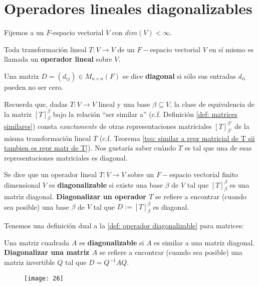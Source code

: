 \section{Operadores lineales diagonalizables}
Fijemos a un $F$-espacio vectorial $V$ con $dim(V) < \infty$.
\begin{defi}
Toda transformación lineal $T: V \longrightarrow V$
de un $F-$espacio vectorial $V$ en sí mismo es llamada un
\textbf{operador lineal} sobre $V$.
\end{defi}
 

\begin{defi}
Una matriz $D = (d_{ij})
\in M_{n \times n}(F)$ se dice \textbf{diagonal} si sólo
sus entradas $d_{ii}$ pueden no ser cero.
\end{defi}

Recuerda que, dadas $T: V \longrightarrow V$ lineal y una base
$\beta \subseteq V$, la clase de equivalencia de la matriz
$[T]_{\beta}^{\beta}$ 
bajo la relación ``ser similar a''
(c.f. Definición \ref{def: matrices similares})
consta \textit{exactamente} de otras representaciones
matriciales $[T]_{\beta'}^{\beta'}$ de la misma transformación 
lineal $T$ 
(c.f. Teorema 
\ref{teo: similar a repr matricial de T sii tambien es repr matr de T}).
Nos gustaría saber cuándo $T$ es tal que una de esas representaciones
matriciales es diagonal.

\begin{defi}
	\label{def: operador diagonalizable}
Se dice que un operador lineal $T: V \longrightarrow V$ sobre
un $F-$espacio vectorial finito dimensional $V$ es
\textbf{diagonalizable} si existe una base $\beta$ de $V$
tal que $[T]_{\beta}^{\beta}$ es una matriz diagonal.
\textbf{Diagonalizar un operador $T$} se refiere a encontrar
(cuando sea posible) una base $\beta$ de $V$ tal que
$D:= [T]_{\beta}^{\beta}$ es diagonal.
\end{defi}
Tenemos una definición dual a la \ref{def: operador diagonalizable}
para matrices:
\begin{defi}
	\label{def: matriz diagonalizable}
Una matriz cuadrada $A$ es \textbf{diagonalizable} si $A$
es similar a una matriz diagonal. 
\textbf{Diagonalizar una matriz $A$} se refiere a encontrar
(cuando sea posible) una matriz invertible $Q$ tal que 
$D = Q^{-1} A Q$.
\end{defi}

\begin{figure}[H]
	\centering
	\texttt{[image: 26]} 
\end{figure}	


